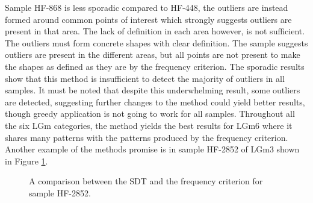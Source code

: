 Sample HF-868 is less sporadic compared to HF-448, the outliers are instead formed around common points of interest which strongly suggests outliers are present in that area. The lack of definition in each area however, is not sufficient. The outliers must form concrete shapes with clear definition. The sample suggests outliers are present in the different areas, but all points are not present to make the shapes as defined as they are by the frequency criterion. 
The sporadic results show that this method is insufficient to detect the majority of outliers in all samples. It must be noted that despite this underwhelming result, some outliers are detected, suggesting further changes to the method could yield better results, though greedy application is not going to work for all samples. Throughout all the six LGm categories, the method yields the best results for LGm6 where it shares many patterns with the patterns produced by the frequency criterion. Another example of the methods promise is in sample HF-2852 of LGm3 shown in Figure \ref{fig:stdHF2852}.

\begin{figure}[H]
    \centering
    \qquad
    \caption{A comparison between the SDT and the frequency criterion for sample HF-2852.
\label{fig:stdHF2852}}%
\end{figure}


